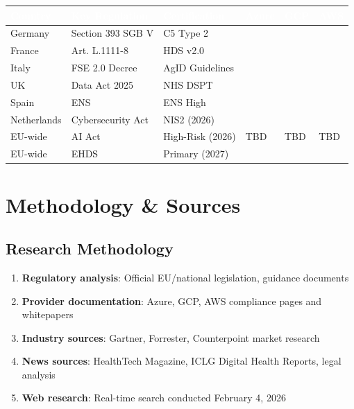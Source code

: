 \documentclass[11pt,a4paper]{article}
\newcommand{\compliant}{\textcolor{msgreen}{\checkmark}}
\begin{document}
\begin{center}
\small
\begin{tabular}{L{2cm}L{3cm}L{3cm}C{1.2cm}C{1.2cm}C{1.2cm}}
\toprule
{}
\textcolor{white}{\textbf{Country}} & \textcolor{white}{\textbf{Key Regulation}} & \textcolor{white}{\textbf{Certification}} & \textcolor{white}{\textbf{Azure}} & \textcolor{white}{\textbf{GCP}} & \textcolor{white}{\textbf{AWS}} \\
\midrule
Germany & Section 393 SGB V & C5 Type 2 & \compliant & \compliant & \compliant \\
France & Art. L.1111-8 & HDS v2.0 & \compliant & \compliant & \compliant \\
Italy & FSE 2.0 Decree & AgID Guidelines & \compliant & \compliant & \compliant \\
UK & Data Act 2025 & NHS DSPT & \compliant & \compliant & \compliant \\
Spain & ENS & ENS High & \compliant & \compliant & \compliant \\
Netherlands & Cybersecurity Act & NIS2 (2026) & \compliant & \compliant & \compliant \\
EU-wide & AI Act & High-Risk (2026) & TBD & TBD & TBD \\
EU-wide & EHDS & Primary (2027) & \compliant & \compliant & \compliant \\
\bottomrule
\end{tabular}
\end{center}

\section{Methodology \& Sources}

\subsection{Research Methodology}

\begin{enumerate}
    \item \textbf{Regulatory analysis}: Official EU/national legislation, guidance documents
    \item \textbf{Provider documentation}: Azure, GCP, AWS compliance pages and whitepapers
    \item \textbf{Industry sources}: Gartner, Forrester, Counterpoint market research
    \item \textbf{News sources}: HealthTech Magazine, ICLG Digital Health Reports, legal analysis
    \item \textbf{Web research}: Real-time search conducted February 4, 2026
\end{enumerate}
\end{document}
